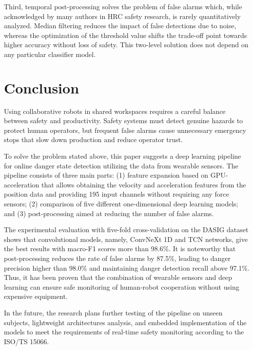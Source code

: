 \documentclass[pdflatex,sn-basic]{sn-jnl}%
\begin{document}
Third, temporal post-processing solves the problem of false alarms which, while acknowledged by many authors in HRC safety research, is rarely quantitatively analyzed. Median filtering reduces the impact of false detections due to noise, whereas the optimization of the threshold value shifts the trade-off point towards higher accuracy without loss of safety. This two-level solution does not depend on any particular classifier model.

\section{Conclusion}\label{sec:conclusion}

Using collaborative robots in shared workspaces requires a careful balance between safety and productivity. Safety systems must detect genuine hazards to protect human operators, but frequent false alarms cause unnecessary emergency stops that slow down production and reduce operator trust.

To solve the problem stated above, this paper suggests a deep learning pipeline for online danger state detection utilizing the data from wearable sensors. The pipeline consists of three main parts: (1) feature expansion based on GPU-acceleration that allows obtaining the velocity and acceleration features from the position data and providing 195 input channels without requiring any force sensors; (2) comparison of five different one-dimensional deep learning models; and (3) post-processing aimed at reducing the number of false alarms.

The experimental evaluation with five-fold cross-validation on the DASIG dataset shows that convolutional models, namely, ConvNeXt 1D and TCN networks, give the best results with macro-F1 scores more than 98.6\%. It is noteworthy that post-processing reduces the rate of false alarms by 87.5\%, leading to danger precision higher than 98.0\% and maintaining danger detection recall above 97.1\%. Thus, it has been proven that the combination of wearable sensors and deep learning can ensure safe monitoring of human-robot cooperation without using expensive equipment.

In the future, the research plans further testing of the pipeline on unseen subjects, lightweight architectures analysis, and embedded implementation of the models to meet the requirements of real-time safety monitoring according to the ISO/TS 15066.

\newpage
\end{document}
